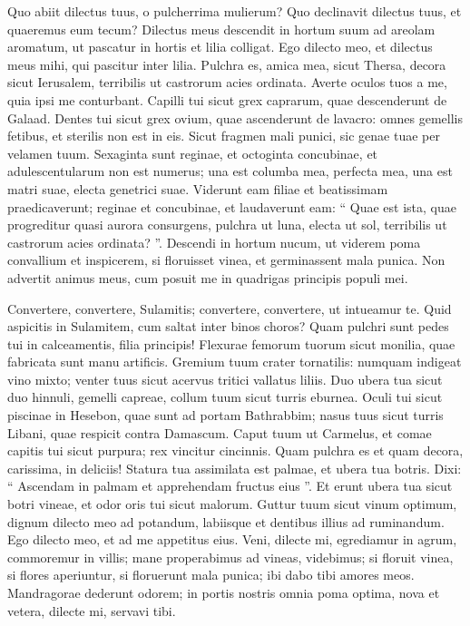 \begin{biblechapter}
\begin{biblechapter}
\begin{biblechapter}
\begin{biblechapter}
\begin{biblechapter}
\begin{biblechapter}
\verse Quo abiit dilectus tuus,
 o pulcherrima mulierum?
 Quo declinavit dilectus tuus,
 et quaeremus eum tecum?
 \verse Dilectus meus descendit in hortum suum
 ad areolam aromatum,
 ut pascatur in hortis
 et lilia colligat.
 \verse Ego dilecto meo, et dilectus meus mihi,
 qui pascitur inter lilia.
 \verse Pulchra es, amica mea, sicut Thersa,
 decora sicut Ierusalem,
 terribilis ut castrorum acies ordinata.
 \verse Averte oculos tuos a me,
 quia ipsi me conturbant.
 Capilli tui sicut grex caprarum,
 quae descenderunt de Galaad.
 \verse Dentes tui sicut grex ovium,
 quae ascenderunt de lavacro:
 omnes gemellis fetibus,
 et sterilis non est in eis.
 \verse Sicut fragmen mali punici, sic genae tuae
 per velamen tuum.
 \verse Sexaginta sunt reginae,
 et octoginta concubinae,
 et adulescentularum non est numerus;
 \verse una est columba mea, perfecta mea,
 una est matri suae,
 electa genetrici suae.
 Viderunt eam filiae et beatissimam praedicaverunt;
 reginae et concubinae, et laudaverunt eam:
 \verse “ Quae est ista, quae progreditur quasi aurora consurgens,
 pulchra ut luna,
 electa ut sol,
 terribilis ut castrorum acies ordinata? ”.
 \verse Descendi in hortum nucum,
 ut viderem poma convallium
 et inspicerem, si floruisset vinea,
 et germinassent mala punica.
 \verse Non advertit animus meus,
 cum posuit me in quadrigas principis populi mei.
 
\begin{biblechapter}
\verse Convertere, convertere, Sulamitis;
 convertere, convertere, ut intueamur te.
 Quid aspicitis in Sulamitem,
 cum saltat inter binos choros?
 \verse Quam pulchri sunt pedes tui in calceamentis,
 filia principis!
 Flexurae femorum tuorum sicut monilia,
 quae fabricata sunt manu artificis.
 \verse Gremium tuum crater tornatilis:
 numquam indigeat vino mixto;
 venter tuus sicut acervus tritici
 vallatus liliis.
 \verse Duo ubera tua sicut duo hinnuli,
 gemelli capreae,
 \verse collum tuum sicut turris eburnea.
 Oculi tui sicut piscinae in Hesebon,
 quae sunt ad portam Bathrabbim;
 nasus tuus sicut turris Libani,
 quae respicit contra Damascum.
 \verse Caput tuum ut Carmelus,
 et comae capitis tui sicut purpura;
 rex vincitur cincinnis.
 \verse Quam pulchra es et quam decora,
 carissima, in deliciis!
 \verse Statura tua assimilata est palmae,
 et ubera tua botris.
 \verse Dixi: “ Ascendam in palmam
 et apprehendam fructus eius ”.
 Et erunt ubera tua sicut botri vineae,
 et odor oris tui sicut malorum.
 \verse Guttur tuum sicut vinum optimum,
 dignum dilecto meo ad potandum,
 labiisque et dentibus illius ad ruminandum.
 \verse Ego dilecto meo,
 et ad me appetitus eius.
 \verse Veni, dilecte mi, egrediamur in agrum,
 commoremur in villis;
 \verse mane properabimus ad vineas,
 videbimus; si floruit vinea,
 si flores aperiuntur,
 si floruerunt mala punica;
 ibi dabo tibi amores meos.
 \verse Mandragorae dederunt odorem;
 in portis nostris omnia poma optima,
 nova et vetera,
 dilecte mi, servavi tibi.
 

\end{biblechapter}
\end{biblechapter}
\end{biblechapter}
\end{biblechapter}
\end{biblechapter}
\end{biblechapter}
\end{biblechapter}

